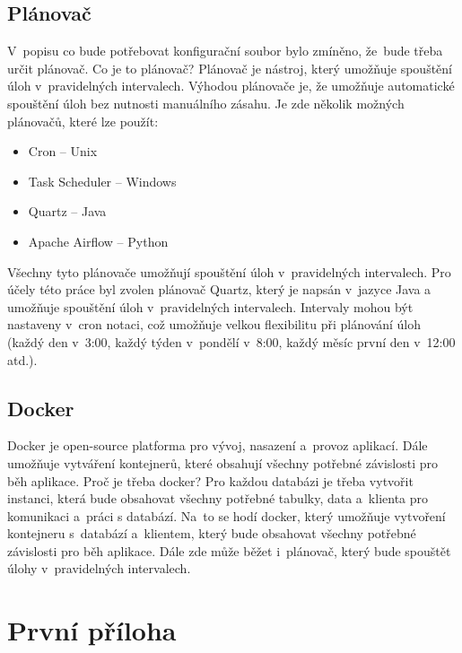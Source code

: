 \documentclass[czech, kiv, ba, he, iso690alph, pdf]{fasthesis}
\begin{document}
\section{Plánovač}
V~popisu co bude potřebovat konfigurační soubor bylo zmíněno, že~bude třeba určit plánovač.
Co je to plánovač?
Plánovač je nástroj, který umožňuje spouštění úloh v~pravidelných intervalech.
Výhodou plánovače je, že umožňuje automatické spouštění úloh bez nutnosti manuálního zásahu.
Je zde několik možných plánovačů, které lze použít:
\begin{itemize}
    \item Cron -- Unix
    \item Task Scheduler -- Windows
    \item Quartz -- Java
    \item Apache Airflow -- Python
\end{itemize}
Všechny tyto plánovače umožňují spouštění úloh v~pravidelných intervalech.
Pro účely této práce byl zvolen plánovač Quartz, který je napsán v~jazyce Java a 
umožňuje spouštění úloh v~pravidelných intervalech.
Intervaly mohou být nastaveny v~cron notaci, což umožňuje velkou flexibilitu při plánování úloh
(každý den v~3:00, každý týden v~pondělí v~8:00, každý měsíc první den v~12:00 atd.).

\section{Docker}
Docker je open-source platforma pro vývoj, nasazení a~provoz aplikací.
Dále umožňuje vytváření kontejnerů, které obsahují všechny potřebné závislosti pro běh aplikace.
Proč je třeba docker?
Pro každou databázi je třeba vytvořit instanci, která bude obsahovat všechny potřebné tabulky, data 
a~klienta pro komunikaci a~práci s databází. Na~to se hodí docker, který umožňuje vytvoření kontejneru s~databází
a~klientem, který bude obsahovat všechny potřebné závislosti pro běh aplikace.
Dále zde může běžet i~plánovač, který bude spouštět úlohy v~pravidelných intervalech.
\cite{docker}


\appendix
\chapter{První příloha}
\backmatter
\printbibliography
\setbackpageqrcode
\backpage
\end{document}
